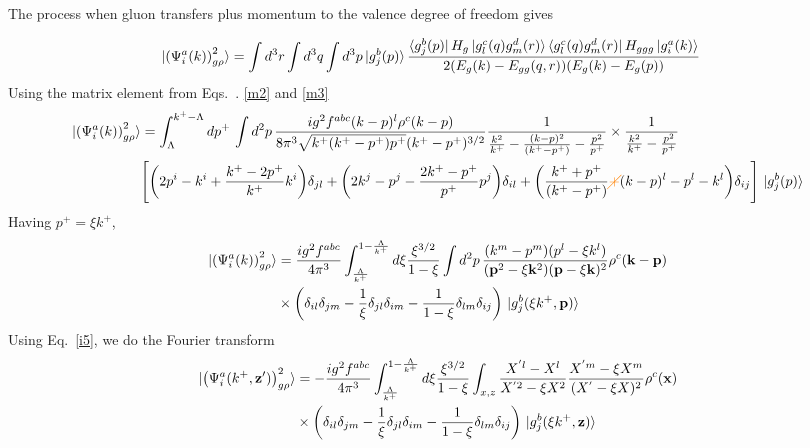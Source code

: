 \documentclass[aps,prd,amsmath,amssymb,nofootinbib]{revtex4-2}
\def\v#1{\mathbf{#1}}
\numberwithin{equation}{section}
\begin{document}
The process when gluon transfers plus momentum {\color{red}to} the valence degree of freedom gives 
\begin{figure}[h]
\end{figure}
\begin{align}\label{onegrho2}
  \ket{ \left(\Psi^{a}_{i}(k) \right)^{2}_{g \rho} }%
   & =  \int d^{3}r \int d^{3}q \int d^{3}p
  \ket{g^{b}_{j}(p)}
  \frac{\bra{g^{b}_{j}(p)}H_{g}\ket{g^{c}_{l}(q)g^{d}_{m}(r)}\bra{g^{c}_{l}(q)g^{d}_{m}(r)}H_{ggg}\ket{g^{a}_{i}(k)}}{2(E_{g}(k)-E_{gg}(q,r))(E_{g }(k)-E_{g}(p))}
\end{align}
Using the matrix element from Eqs.~. \eqref{m2} and \eqref{m3}
\begin{align}\label{onegrho22}
\ket{ \left(\Psi^{a}_{i}(k) \right)^{2}_{g \rho} }   &= \int_{\Lambda}^{k^{+}-\Lambda}dp^{+}\,\int d^{2}p\,\frac{ig^{2}f^{abc}(k-p)^{l}\rho^{c}(k-p)}{8\pi^{3}\sqrt{k^{+}(k^{+}-p^{+})p^{+}}(k^{+}-p^{+})^{3/2}}\frac{1}{\frac{k^{2}}{k^{+}}-\frac{(k-p)^{2}}{(k^{+}-p^{+})}-\frac{p^{2}}{p^{+}}}\times \frac{1}{\frac{k^{2}}{k^{+}}-\frac{p^{2}}{p^{+}}}\notag \\ & \Bigg[\bigg(2p^{i}-k^{i}+\frac{k^{+}-2p^{+}}{k^{+}}k^{i}\bigg)\delta_{jl} +\bigg(2k^{j}-p^{j}-\frac{2k^{+}-p^{+}}{p^{+}}p^{j}\bigg)\delta_{il}+\bigg(\frac{k^{+}+p^{+}}{(k^{+}-p^{+})}{\color{orange}\cancel{+}}(k-p)^{l}-p^{l}-k^{l}\bigg)\delta_{ij}\Bigg]\,\ket{g^{b}_{j}(p)}
\end{align}
Having $p^{+} = \xi k^{+}$,
\begin{align}
\ket{ \left(\Psi^{a}_{i}(k) \right)^{2}_{g \rho} }   & = \frac{i g^2 f^{abc}} {4\pi^3} 
   \int_{\frac{\Lambda}{k^+}   }^{ 1- \frac{\Lambda }{k^+} } %
   d \xi 
  \frac{\xi^{3/2}}{1-\xi} 
   \int d^{2}p\,
  \frac{(k^m - p^m) (p^l - \xi k^l)} {(\v{p}^2-\xi \v{k}^2) (\v{p} - \xi \v{k})^2}
   \rho^c(\v{k}-\v{p})
  \notag \\ & \times 
  \left(\delta_{il} \delta_{jm} - \frac{1}{\xi} \delta_{jl} \delta_{im} - \frac{1}{1-\xi} \delta_{lm}\delta_{ij} \right)\,\ket{g^{b}_{j}(\xi k^+,\v{p})}
\end{align}
Using Eq.~\eqref{i5}, we do the Fourier transform
\begin{align}%
\label{Eq:onegrhoX2}
  \notag
  \ket{ \left(\Psi^{a}_{i}(k^+, \v{z}') \right)^{2}_{g \rho} }%
   &= - \frac{i g^2 f^{abc}} {4\pi^3} 
   \int_{\frac{\Lambda}{k^+}   }^{ 1- \frac{\Lambda }{k^+} } %
   d \xi 
  \frac{\xi^{3/2}}{1-\xi} 
   \int_{x,z}
   \frac{X^{'l} - X^l} {X^{'2} - \xi X^2}
   \frac{X^{'m} -  \xi X^m} {(X^{'} -  \xi X)^2}
   \rho^c(\v{x})
  \notag \\ & \times 
  \left(\delta_{il} \delta_{jm} - \frac{1}{\xi} \delta_{jl} \delta_{im} - \frac{1}{1-\xi} \delta_{lm}\delta_{ij} \right)\,\ket{g^{b}_{j}(\xi k^+,\v{z})}
\end{align}
\end{document}
